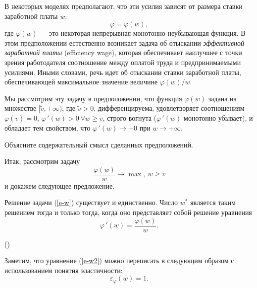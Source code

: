     В некоторых моделях предполагают, что эти усилия
    зависят от размера ставки заработной платы $w$:
    \[\varphi=\varphi(w),\]
    где $\varphi(w)$ --- это некоторая непрерывная
    монотонно неубывающая функция. В этом предположении естественно
    возникает задача об отыскании \emph{эффективной заработной
    платы} (efficiency wage), которая обеспечивает наилучшее с точки
    зрения работодателя соотношение между оплатой труда и
    предпринимаемыми усилиями. Иными словами, речь идет об отыскании
    ставки заработной платы, обеспечивающей максимальное значение
    величине $\varphi(w)/w$.

    Мы рассмотрим эту задачу в предположении, что функция $\varphi(w)$
    задана на  множестве $[\tilde{v},+\infty)$, где $\tilde{v}>0$, дифференцируема,
    удовлетворяет соотношениям  $\varphi(\tilde{v})=0$,
    $\varphi\,'(w)>0 \ \forall w\geqslant \tilde{v}$, строго вогнута
    ($\varphi\,'(w)$ монотонно убывает),  и обладает тем
    свойством, что $\varphi\,'(w)\rightarrow+0$ при
    $w\rightarrow+\infty$.



\begin{exer}
    Объясните содержательный смысл сделанных предположений.
\end{exer}

    Итак, рассмотрим задачу
\begin{equation}
\label{e-w}
    \frac{\varphi(w)}{w}\rightarrow\max, \ w\geqslant \tilde{v}
\end{equation}
    и докажем следующее предложение.
\begin{prop}
\label{e-w1}
    Решение задачи (\ref{e-w}) существует и единственно. Число $w^{*}$ является
    таким решением тогда и только тогда, когда оно представляет
    собой решение уравнения
\begin{equation}
\label{e-w2}
    \varphi\,'(w)=\frac{\varphi(w)}{w}.
\end{equation}
\end{prop}                  ()

    Заметим, что уравнение (\ref{e-w2}) можно переписать в следующим
    образом с использованием понятия эластичности:
    \[\varepsilon_{\varphi}(w)=1.\]

